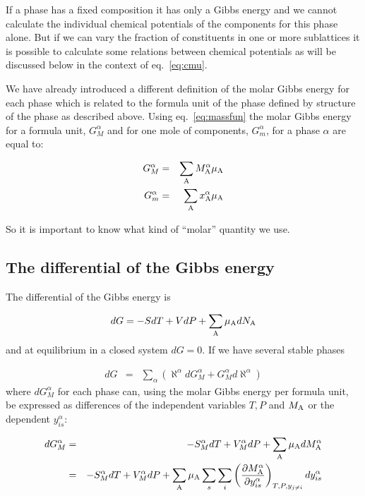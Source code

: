 \documentclass[12pt]{article}
\begin{document}
If a phase has a fixed composition it has only a Gibbs energy and we
cannot calculate the individual chemical potentials of the components
for this phase alone.  But if we can vary the fraction of constituents
in one or more sublattices it is possible to calculate some relations
between chemical potentials as will be discussed below in the context
of eq.~\ref{eq:cmu}.

We have already introduced a different definition of the molar Gibbs
energy for each phase which is related to the formula unit of the
phase defined by structure of the phase as described above.  Using
eq.~\ref{eq:massfun} the molar Gibbs energy for a formula unit,
$G_M^{\alpha}$ and for one mole of components, $G_m^{\alpha}$, for a
phase $\alpha$ are equal to:

\begin{eqnarray}
G_M^{\alpha} &=& \sum_{\rm A} M_{\rm A}^{\alpha} \mu_{\rm A}\\
G_m^{\alpha} &=& \sum_{\rm A} x_{\rm A}^{\alpha} \mu_{\rm A}
\end{eqnarray}

So it is important to know what kind of ``molar'' quantity we use.

\subsection{The differential of the Gibbs energy}

The differential of the Gibbs energy is

\begin{equation}
dG = -SdT+VdP+\sum_{\rm A}\mu_{\rm A}dN_{\rm A} \label{eq:dg1}
\end{equation}
and at equilibrium in a closed system $dG=0$.  If we have several
stable phases

\begin{eqnarray}
dG &=& \sum_{\alpha}(\aleph^{\alpha}dG_M^{\alpha}+G_M^{\alpha}d\aleph^{\alpha})
\end{eqnarray}
where $dG_M^{\alpha}$ for each phase can, using the molar Gibbs energy
per formula unit, be expressed as differences of the independent
variables $T, P$ and $M_{\rm A}$ or the dependent $y^{\alpha}_{is}$:

\begin{eqnarray}
dG_M^{\alpha} &=& -S_M^{\alpha}dT+V_M^{\alpha}dP+
\sum_{\rm A}\mu_{\rm A}dM^{\alpha}_{\rm A} \nonumber\\&=&
-S_M^{\alpha}dT+V_M^{\alpha}dP+
\sum_{\rm A}\mu_{\rm A}\sum_s \sum_i
\left(\frac{\partial M^{\alpha}_{\rm A}}{\partial y^{\alpha}_{is}}
\right)_{T,P,y_{j\ne i}}
dy^{\alpha}_{is} \label{eq:dgmfu}
\end{eqnarray}
\end{document}

